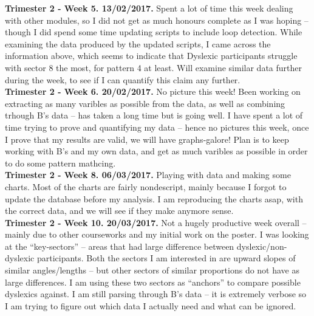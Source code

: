 \begin{appendices}
		\textbf{Trimester 2 - Week 5. 13/02/2017.}
		Spent a lot of time this week dealing with other modules, so I did not get as much honours complete as I was hoping – though I did spend some time updating scripts to include loop detection.
		While examining the data produced by the updated scripts, I came across the information above, which seems to indicate that Dyslexic participants struggle with sector 8 the most, for pattern 4 at least.
		Will examine similar data further during the week, to see if I can quantify this claim any further.\\
		
		\textbf{Trimester 2 - Week 6. 20/02/2017.}
		No picture this week!
		Been working on extracting as many varibles as possible from the data, as well as combining  trhough B’s data – has taken a long time but is going well.
		I have spent a lot of time trying to prove and quantifying my data – hence no pictures this week, once I prove that my results are valid, we will have graphs-galore!
		Plan is to keep working with B’s and my own data, and get as much varibles as possible in order to do some pattern mathcing.\\
		
		\textbf{Trimester 2 - Week 8. 06/03/2017.}
		Playing with data and making some charts.
		Most of the charts are fairly nondescript, mainly because I forgot to update the database before my analysis.
		I am reproducing the charts asap, with the correct data, and we will see if they make anymore sense.\\
		
		\textbf{Trimester 2 - Week 10. 20/03/2017.}
		Not a hugely productive week overall – mainly due to other courseworks and my initial work on the poster.
		I was looking at the “key-sectors” – areas that had large difference between dyslexic/non-dyslexic participants.
		Both the sectors I am interested in are upward slopes of similar angles/lengths – but other sectors of similar proportions do not have as large differences.
		I am using these two sectors as “anchors” to compare possible dyslexics against.
		I am still parsing through B’s data – it is extremely verbose so I am trying to figure out which data I actually need and what can be ignored.
		
\end{appendices}